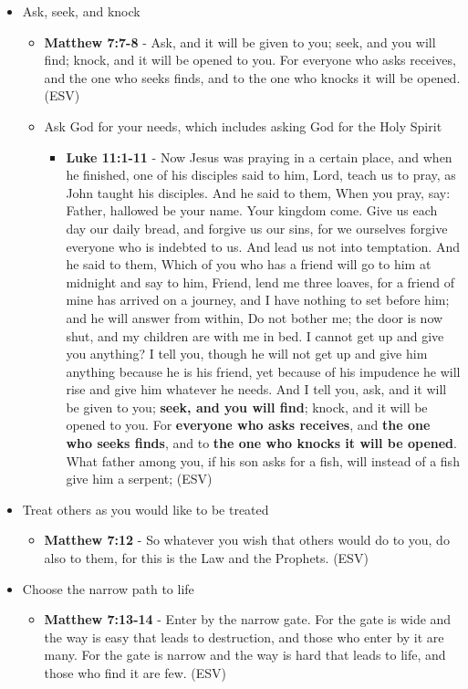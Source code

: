 \documentclass[11pt]{article}
\begin{document}
\begin{itemize}
\begin{itemize}
\end{itemize}
\item Ask, seek, and knock
\begin{itemize}
\item \textbf{Matthew 7:7-8} - Ask, and it will be given to you; seek, and you will find; knock, and it will be opened to you. For everyone who asks receives, and the one who seeks finds, and to the one who knocks it will be opened. (ESV)
\item Ask God for your needs, which includes asking God for the Holy Spirit
\begin{itemize}
\item \textbf{Luke 11:1-11} - Now Jesus was praying in a certain place, and when he finished, one of his disciples said to him, Lord, teach us to pray, as John taught his disciples. And he said to them, When you pray, say: Father, hallowed be your name. Your kingdom come. Give us each day our daily bread, and forgive us our sins, for we ourselves forgive everyone who is indebted to us. And lead us not into temptation. And he said to them, Which of you who has a friend will go to him at midnight and say to him, Friend, lend me three loaves, for a friend of mine has arrived on a journey, and I have nothing to set before him; and he will answer from within, Do not bother me; the door is now shut, and my children are with me in bed. I cannot get up and give you anything? I tell you, though he will not get up and give him anything because he is his friend, yet because of his impudence he will rise and give him whatever he needs. And I tell you, ask, and it will be given to you; \textbf{seek, and you will find}; knock, and it will be opened to you. For \textbf{everyone who asks receives}, and \textbf{the one who seeks finds}, and to \textbf{the one who knocks it will be opened}. What father among you, if his son asks for a fish, will instead of a fish give him a serpent; (ESV)
\end{itemize}
\end{itemize}
\item Treat others as you would like to be treated
\begin{itemize}
\item \textbf{Matthew 7:12} - So whatever you wish that others would do to you, do also to them, for this is the Law and the Prophets. (ESV)
\end{itemize}
\item Choose the narrow path to life
\begin{itemize}
\item \textbf{Matthew 7:13-14} - Enter by the narrow gate. For the gate is wide and the way is easy that leads to destruction, and those who enter by it are many. For the gate is narrow and the way is hard that leads to life, and those who find it are few. (ESV)

\end{itemize}
\end{itemize}
\end{document}
